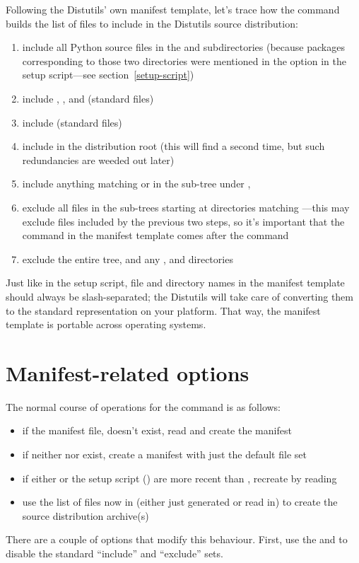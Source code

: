\documentclass{manual}
\begin{document}
Following the Distutils' own manifest template, let's trace how the
 command builds the list of files to include in the
Distutils source distribution:
\begin{enumerate}
\item include all Python source files in the  and
   subdirectories (because packages
  corresponding to those two directories were mentioned in the
   option in the setup script---see
  section~\ref{setup-script})
\item include , , and 
  (standard files)
\item include  (standard files)
\item include  in the distribution root (this will find
   a second time, but such redundancies are weeded out
  later)
\item include anything matching  or  in the
  sub-tree under ,
\item exclude all files in the sub-trees starting at directories
  matching ---this may exclude files
  included by the previous two steps, so it's important that the
   command in the manifest template comes after the
   command
\item exclude the entire  tree, and any ,
   and  directories
\end{enumerate}
Just like in the setup script, file and directory names in the manifest
template should always be slash-separated; the Distutils will take care
of converting them to the standard representation on your platform.
That way, the manifest template is portable across operating systems.


\section{Manifest-related options}
\label{manifest-options}

The normal course of operations for the  command is as
follows:
\begin{itemize}
\item if the manifest file,  doesn't exist, read
   and create the manifest
\item if neither  nor  exist, create a
  manifest with just the default file set
\item if either  or the setup script ()
  are more recent than , recreate  by
  reading 
\item use the list of files now in  (either just
  generated or read in) to create the source distribution archive(s)
\end{itemize}
There are a couple of options that modify this behaviour.  First, use
the  and  to
disable the standard ``include'' and ``exclude'' sets.
\end{document}
